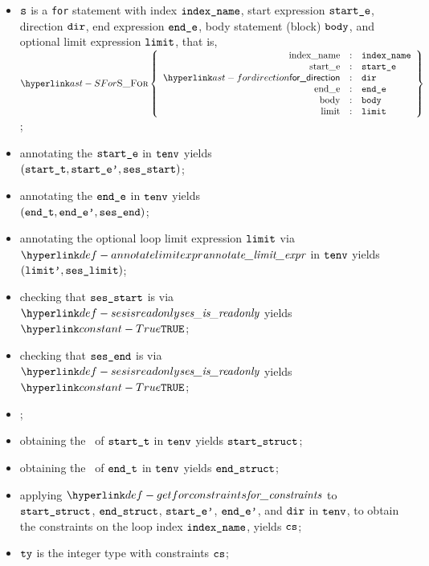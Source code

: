 \ProseParagraph
\AllApply
\begin{itemize}
  \item $\texttt{s}$ is a \texttt{for} statement with index $\texttt{index\_name}$,
        start expression $\texttt{start\_e}$,
        direction $\texttt{dir}$,
        end expression $\texttt{end\_e}$,
        body statement (block) $\texttt{body}$,
        and optional limit expression $\texttt{limit}$,
        that is, $\SFor\left\{\begin{array}{rcl}
          \Forindexname &:& \vindexname\\
          \Forstarte &:& \vstarte\\
          \fordirection &:& \vdir\\
          \Forende &:& \vende\\
          \Forbody &:& \vbody\\
          \Forlimit &:& \vlimit
        \end{array}\right\}$;
  \item annotating the \rhsexpression{} $\texttt{start\_e}$ in $\texttt{tenv}$ yields \\
        $(\texttt{start\_t}, \texttt{start\_e'}, \texttt{ses\_start})$\ProseOrTypeError;
  \item annotating the \rhsexpression{} $\texttt{end\_e}$ in $\texttt{tenv}$ yields \\ $(\texttt{end\_t}, \texttt{end\_e'}, \texttt{ses\_end})$\ProseOrTypeError;
  \item annotating the optional loop limit expression $\texttt{limit}$ via $\annotatelimitexpr$ in $\texttt{tenv}$
        yields $(\texttt{limit'}, \texttt{ses\_limit})$\ProseOrTypeError;
  \item checking that $\texttt{ses\_start}$ is \readonlyterm{} via $\sesisreadonly$ yields $\True$\ProseOrTypeError;
  \item checking that $\texttt{ses\_end}$ is \readonlyterm{} via $\sesisreadonly$ yields $\True$\ProseOrTypeError;
  \item {};
  \item obtaining the \underlyingtypeterm\ of $\texttt{start\_t}$ in $\texttt{tenv}$ yields $\texttt{start\_struct}$\ProseOrTypeError;
  \item obtaining the \underlyingtypeterm\ of $\texttt{end\_t}$ in $\texttt{tenv}$ yields $\texttt{end\_struct}$\ProseOrTypeError;
  \item applying $\getforconstraints$ to $\texttt{start\_struct}$, $\texttt{end\_struct}$,
        $\texttt{start\_e'}$, $\texttt{end\_e'}$, and $\texttt{dir}$ in $\texttt{tenv}$,
        to obtain the constraints on the loop index $\texttt{index\_name}$,
        yields $\texttt{cs}$\ProseOrTypeError;
  \item $\texttt{ty}$ is the integer type with constraints $\texttt{cs}$;

\end{itemize}
